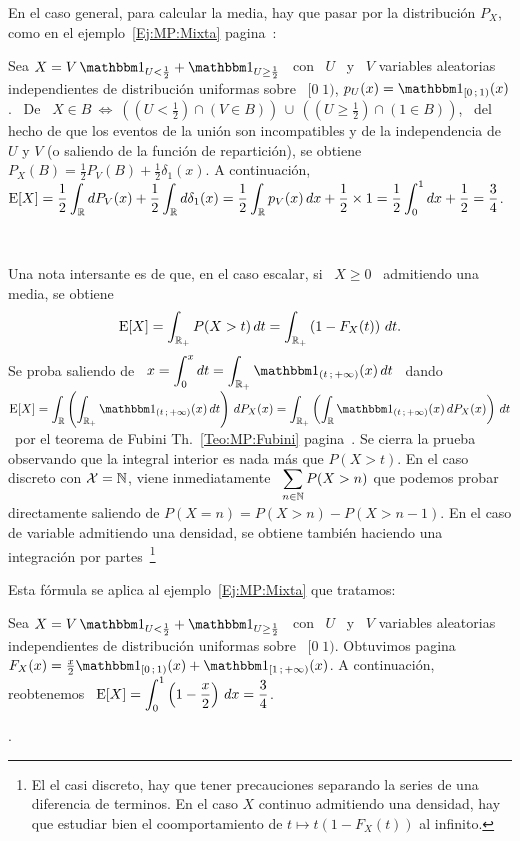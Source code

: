 En el caso general, para calcular  la media, hay que pasar por la distribuci\'on
$P_X$, como en el ejemplo~\ref{Ej:MP:Mixta}  pagina~\pageref{Ej:MP:Mixta}:
%
\begin{ejemplo}
\label{Ej:MP:EspMixta}
%
Sea $X =  V \, \un_{U <  \frac12} + \un_{U \ge \frac12}$  \ con \ $U$ \  y \ $V$
variables aleatorias  independientes de distribuci\'on uniformas sobre  \ $[0 \;
1)$, \ie  $p_U(x) = \un_{[0 \;  1)}(x)$. \ De \  $X \in B  \: \Leftrightarrow \:
\left( \left( U < \frac12 \right) \cap \left( V \in B \right) \right) \, \cup \,
\left( \left( U \ge \frac12 \right) \cap  \left( 1 \in B \right) \right)$, \ del
hecho de que  los eventos de la uni\'on son incompatibles  y de la independencia
de $U$ y $V$ (o saliendo de la funci\'on de repartici\'on), se obtiene $P_X(B) =
\frac12  P_V(B)  + \frac12  \delta_1(x)$.   A  continuaci\'on, \  $\displaystyle
\operatorname{E}[X] = \frac12 \int_{\mathbb{R}} dP_V(x) + \frac12 \int_{\mathbb{R}} d\delta_1(x) = \frac12
\int_{\mathbb{R}} p_V(x)  \, dx + \frac12  \times 1 =  \frac12 \int_0^1 dx +  \frac12 =
\frac34$.
\end{ejemplo}

\

Una nota intersante es  de que, en el caso escalar, si \  $X \ge 0$ \ admitiendo
una media, se obtiene
%
\[
\operatorname{E}[X]  = \int_{\mathbb{R}_+} P(X  > t)  \, dt  = \int_{\mathbb{R}_+}  \left( 1  - F_X(t)
\right) \, dt.
\]
%
Se proba saliendo  de \ $\displaystyle x = \int_0^x  dt = \int_{\Rset_+} \un_{(t
  \; +\infty)}(x)  \, dt$ \ dando  \ $\displaystyle \Esp[X]  = \int_\Rset \left(
  \int_{\Rset_+}   \un_{(t  \;  +\infty)}(x)   \,  dt   \right)  \,   dP_X(x)  =
\int_{\Rset_+} \left(  \int_\Rset \un_{(t \; +\infty)}(x) \,  dP_X(x) \right) \,
dt$     \     por    el     teorema     de    Fubini     Th.~\ref{Teo:MP:Fubini}
pagina~\pageref{Teo:MP:Fubini}. Se  cierra la prueba observando  que la integral
interior es nada  m\'as que $P(X > t)$.   En el caso discreto con  $\mathcal{X} = \mathbb{N}$,
viene  inmediatamente \ $\displaystyle  \sum_{n \in  \mathbb{N}} P(X>n)$  que podemos
probar directamente  saliendo de $P(X  = n) =  P(X>n)- P(X>n-1)$. En el  caso de
variable   admitiendo  una   densidad,   se  obtiene   tambi\'en  haciendo   una
integraci\'on  por   partes~\footnote{El  el   casi  discreto,  hay   que  tener
  precauciones separando la series de una diferencia de terminos. En el caso $X$
  continuo admitiendo una densidad, hay  que estudiar bien el coomportamiento de
  $t \mapsto t (1-F_X(t))$ al infinito.}

Esta f\'ormula se aplica al ejemplo~\ref{Ej:MP:Mixta} que tratamos:
%
\begin{ejemplo}
\label{Ej:MP:EspMixtaPositiva}
%
Sea $X =  V \, \un_{U <  \frac12} + \un_{U \ge \frac12}$  \ con \ $U$ \  y \ $V$
variables aleatorias  independientes de distribuci\'on uniformas sobre  \ $[0 \;
1)$.  Obtuvimos pagina~\pageref{Ej:MP:Mixta} \  $F_X(x) = \frac{x}{2} \un_{[0 \;
  1)}(x)  +   \un_{[1  \;   +\infty)}(x)$.   A  continuaci\'on,   reobtenemos  \
$\displaystyle  \operatorname{E}[X]  = \int_0^1  \left(  1 -  \frac{x}{2}  \right)  \, dx  =
\frac34$.
\end{ejemplo}.

